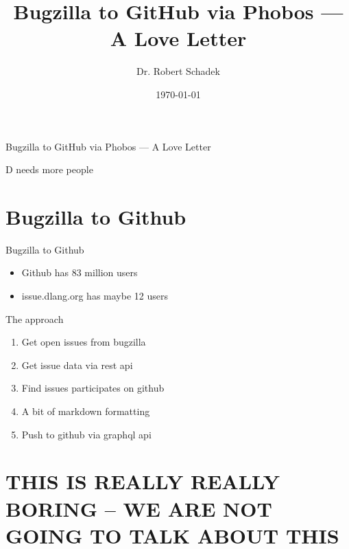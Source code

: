 \documentclass[aspectratio=169,notes]{beamer}
\title{Bugzilla to GitHub via Phobos --- A Love Letter}
\date{\today}
\author{Dr. Robert Schadek}
\begin{document}
	\maketitle

	\begin{frame}[fragile]{Bugzilla to GitHub via Phobos --- A Love Letter}
		\begin{center}
			{\huge D needs more people}
		\end{center}
	\end{frame}

	\section{Bugzilla to Github}
	\begin{frame}[fragile]{Bugzilla to Github}
		\Large
		\begin{itemize}
			\item Github has 83 million users
			\item issue.dlang.org has maybe 12 users
		\end{itemize}
	\end{frame}

	\begin{frame}[fragile]{The approach}
		\begin{enumerate}
			\item Get open issues from bugzilla
			\item Get issue data via rest api
			\item Find issues participates on github
			\item A bit of markdown formatting
			\item Push to github via graphql api
		\end{enumerate}
	\end{frame}

	\section{THIS IS REALLY REALLY BORING -- WE ARE NOT GOING TO TALK ABOUT THIS}
\end{document}
